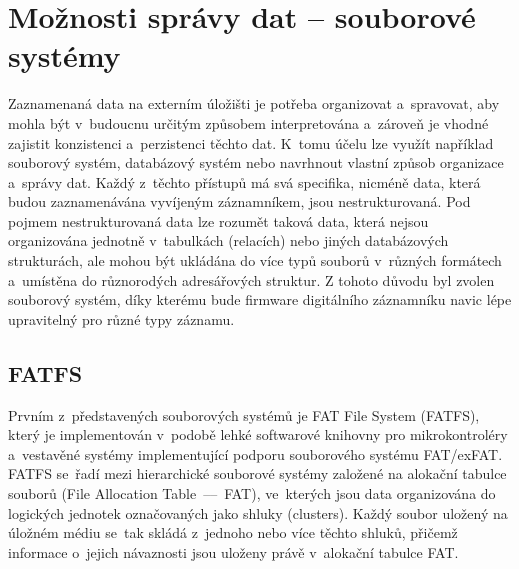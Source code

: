 



\section{Možnosti správy dat -- souborové systémy}
Zaznamenaná data na externím úložišti je potřeba organizovat a~spravovat, aby mohla být v~budoucnu určitým způsobem interpretována a~zároveň je vhodné zajistit konzistenci a~perzistenci těchto dat. K~tomu účelu lze využít například souborový systém, databázový systém nebo navrhnout vlastní způsob organizace a~správy dat. Každý z~těchto přístupů má svá specifika, nicméně data, která budou zaznamenávána vyvíjeným záznamníkem, jsou nestrukturovaná. Pod pojmem nestrukturovaná data lze rozumět taková data, která nejsou organizována jednotně v~tabulkách (relacích) nebo jiných databázových strukturách, ale mohou být ukládána do více typů souborů v~různých formátech a~umístěna do různorodých adresářových struktur. Z tohoto důvodu byl zvolen souborový systém, díky kterému bude firmware digitálního záznamníku navic lépe upravitelný pro různé typy záznamu.~\cite{weka_structured_unstructured_data, virginia_tech_file_database_systems}

\subsection{FATFS}
\label{fatfs}
Prvním z~představených souborových systémů je FAT File System (FATFS), který je implementován v~podobě lehké softwarové knihovny pro mikrokontroléry a~vestavěné systémy implementující podporu souborového systému FAT/exFAT. FATFS se~řadí mezi hierarchické souborové systémy založené na alokační tabulce souborů (File Allocation Table~––~FAT), ve~kterých jsou data organizována do logických jednotek označovaných jako shluky (clusters). Každý soubor uložený na úložném médiu se~tak skládá z~jednoho nebo více těchto shluků, přičemž informace o~jejich návaznosti jsou uloženy právě v~alokační tabulce FAT.~\cite{elm_fat_filesystem_docs, recoverit_fat_filesystem}

